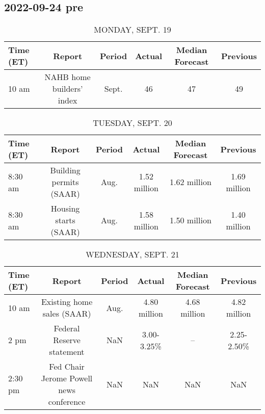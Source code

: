 \documentclass{book}
\begin{document}
  
  

  
  \subsection{ 2022-09-24 pre }
  \normalsize%
  
  
  \begin{table}[htbp]%
  \caption{MONDAY, SEPT. 19}%
  \centering%
  \begin{adjustbox}{width=1\textwidth}%
  \begin{tabular}{lccccc}
  \toprule
  Time (ET) &                    Report & Period & Actual & Median Forecast & Previous \\
  \midrule
      10 am & NAHB home builders' index &  Sept. &     46 &              47 &       49 \\
  \bottomrule
  \end{tabular}
  \end{adjustbox}%
  \end{table}
  
  
  
  \begin{table}[htbp]%
  \caption{TUESDAY, SEPT. 20}%
  \centering%
  \begin{adjustbox}{width=1\textwidth}%
  \begin{tabular}{lccccc}
  \toprule
  Time (ET) &                  Report & Period &       Actual & Median Forecast &     Previous \\
  \midrule
    8:30 am & Building permits (SAAR) &   Aug. & 1.52 million &    1.62 million & 1.69 million \\
    8:30 am &   Housing starts (SAAR) &   Aug. & 1.58 million &    1.50 million & 1.40 million \\
  \bottomrule
  \end{tabular}
  \end{adjustbox}%
  \end{table}
  
  
  
  \begin{table}[htbp]%
  \caption{WEDNESDAY, SEPT. 21}%
  \centering%
  \begin{adjustbox}{width=1\textwidth}%
  \begin{tabular}{lccccc}
  \toprule
  Time (ET) &                                  Report & Period &       Actual & Median Forecast &     Previous \\
  \midrule
      10 am &              Existing home sales (SAAR) &   Aug. & 4.80 million &    4.68 million & 4.82 million \\
       2 pm &               Federal Reserve statement &    NaN &   3.00-3.25\% &              -- &   2.25-2.50\% \\
    2:30 pm & Fed Chair Jerome Powell news conference &    NaN &          NaN &             NaN &          NaN \\
  \bottomrule
  \end{tabular}
  \end{adjustbox}%
  \end{table}
  
\end{document}
